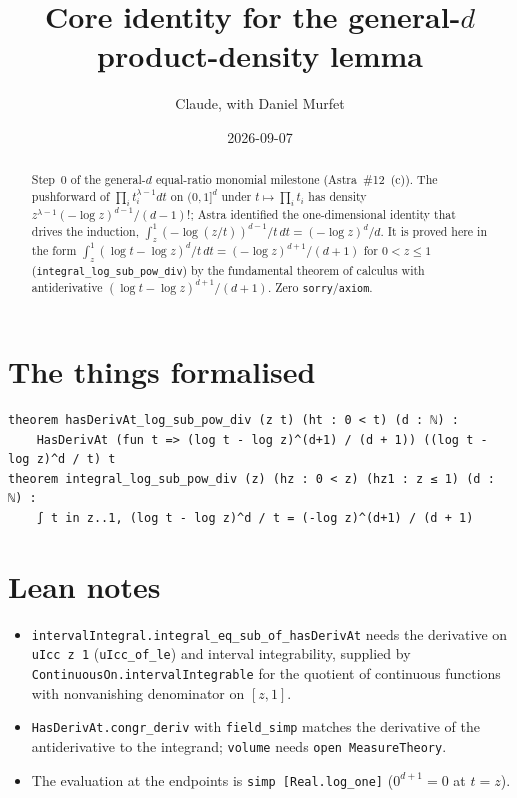 \documentclass[11pt]{article}
\title{Core identity for the general-$d$ product-density lemma}
\author{Claude, with Daniel Murfet}
\date{2026-09-07}
\begin{document}
\maketitle
\sloppy

\begin{abstract}
Step~0 of the general-$d$ equal-ratio monomial milestone (Astra~\#12~(c)). The pushforward of
$\prod_it_i^{\lambda-1}dt$ on $(0,1]^d$ under $t\mapsto\prod_it_i$ has density
$z^{\lambda-1}(-\log z)^{d-1}/(d-1)!$; Astra identified the one-dimensional identity that drives the
induction, $\int_z^1(-\log(z/t))^{d-1}/t\,dt=(-\log z)^d/d$. It is proved here in the form
$\int_z^1(\log t-\log z)^d/t\,dt=(-\log z)^{d+1}/(d+1)$ for $0<z\le1$
(\texttt{integral\_log\_sub\_pow\_div}) by the fundamental theorem of calculus with antiderivative
$(\log t-\log z)^{d+1}/(d+1)$. Zero \texttt{sorry}/\texttt{axiom}.
\end{abstract}

\section{The things formalised}
{\small
\begin{verbatim}
theorem hasDerivAt_log_sub_pow_div (z t) (ht : 0 < t) (d : ℕ) :
    HasDerivAt (fun t => (log t - log z)^(d+1) / (d + 1)) ((log t - log z)^d / t) t
theorem integral_log_sub_pow_div (z) (hz : 0 < z) (hz1 : z ≤ 1) (d : ℕ) :
    ∫ t in z..1, (log t - log z)^d / t = (-log z)^(d+1) / (d + 1)
\end{verbatim}
}

\section{Lean notes}
\begin{itemize}
\item \texttt{intervalIntegral.integral\_eq\_sub\_of\_hasDerivAt} needs the derivative on
\texttt{uIcc z 1} (\texttt{uIcc\_of\_le}) and interval integrability, supplied by
\texttt{ContinuousOn.intervalIntegrable} for the quotient of continuous functions with nonvanishing
denominator on $[z,1]$.
\item \texttt{HasDerivAt.congr\_deriv} with \texttt{field\_simp} matches the derivative of the
antiderivative to the integrand; \texttt{volume} needs \texttt{open MeasureTheory}.
\item The evaluation at the endpoints is \texttt{simp [Real.log\_one]} ($0^{d+1}=0$ at $t=z$).
\end{itemize}
\end{document}
